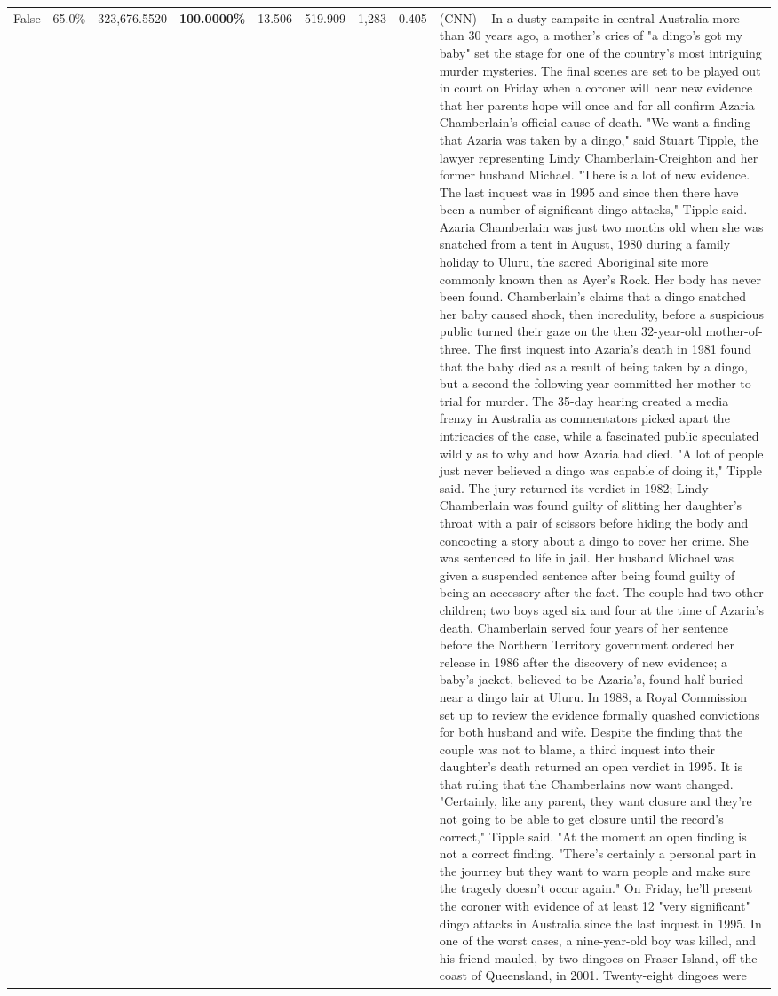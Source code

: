 \begin{table}[H]
\begin{tabular}{lllrlllll}
False & 65.0\% & 323,676.5520 & \bfseries \color{red} 100.0000\% & 13.506 & 519.909 & 1,283 & 0.405 & (CNN) -- In a dusty campsite in central Australia more than 30 years ago, a mother's cries of "a dingo's got my baby" set the stage for one of the country's most intriguing murder mysteries. The final scenes are set to be played out in court on Friday when a coroner will hear new evidence that her parents hope will once and for all confirm Azaria Chamberlain's official cause of death. "We want a finding that Azaria was taken by a dingo," said Stuart Tipple, the lawyer representing Lindy Chamberlain-Creighton and her former husband Michael. "There is a lot of new evidence. The last inquest was in 1995 and since then there have been a number of significant dingo attacks," Tipple said. Azaria Chamberlain was just two months old when she was snatched from a tent in August, 1980 during a family holiday to Uluru, the sacred Aboriginal site more commonly known then as Ayer's Rock. Her body has never been found. Chamberlain's claims that a dingo snatched her baby caused shock, then incredulity, before a suspicious public turned their gaze on the then 32-year-old mother-of-three. The first inquest into Azaria's death in 1981 found that the baby died as a result of being taken by a dingo, but a second the following year committed her mother to trial for murder. The 35-day hearing created a media frenzy in Australia as commentators picked apart the intricacies of the case, while a fascinated public speculated wildly as to why and how Azaria had died. "A lot of people just never believed a dingo was capable of doing it," Tipple said. The jury returned its verdict in 1982; Lindy Chamberlain was found guilty of slitting her daughter's throat with a pair of scissors before hiding the body and concocting a story about a dingo to cover her crime. She was sentenced to life in jail. Her husband Michael was given a suspended sentence after being found guilty of being an accessory after the fact. The couple had two other children; two boys aged six and four at the time of Azaria's death. Chamberlain served four years of her sentence before the Northern Territory government ordered her release in 1986 after the discovery of new evidence; a baby's jacket, believed to be Azaria's, found half-buried near a dingo lair at Uluru. In 1988, a Royal Commission set up to review the evidence formally quashed convictions for both husband and wife. Despite the finding that the couple was not to blame, a third inquest into their daughter's death returned an open verdict in 1995. It is that ruling that the Chamberlains now want changed. "Certainly, like any parent, they want closure and they're not going to be able to get closure until the record's correct," Tipple said. "At the moment an open finding is not a correct finding. "There's certainly a personal part in the journey but they want to warn people and make sure the tragedy doesn't occur again." On Friday, he'll present the coroner with evidence of at least 12 "very significant" dingo attacks in Australia since the last inquest in 1995. In one of the worst cases, a nine-year-old boy was killed, and his friend mauled, by two dingoes on Fraser Island, off the coast of Queensland, in 2001. Twenty-eight dingoes were 
\end{tabular}
\end{table}
